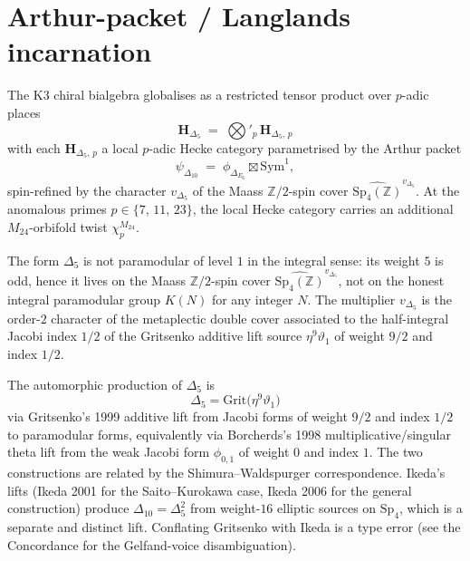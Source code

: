 \section{Arthur-packet / Langlands incarnation}
\label{sec:k3-arthur-packet}

\begin{theorem}
\label{thm:arthur-packet-H-delta5}
The K3 chiral bialgebra globalises as a restricted tensor product over $p$-adic
places
\[
 \mathbf{H}_{\Delta_5}
 \;=\;
 \bigotimes'_{p}\, \mathbf{H}_{\Delta_5,\,p}
\]
with each $\mathbf{H}_{\Delta_5,\,p}$ a local $p$-adic Hecke category parametrised by
the Arthur packet
\[
 \psi_{\Delta_{10}}
 \;=\;
 \phi_{\Delta_{E_6}} \boxtimes \mathrm{Sym}^1,
\]
spin-refined by the character $v_{\Delta_5}$ of the Maass $\mathbb{Z}/2$-spin cover
$\widehat{\mathrm{Sp}_4(\mathbb{Z})}^{v_{\Delta_5}}$. At the anomalous primes
$p \in \{7,\, 11,\, 23\}$, the local Hecke category carries an additional
$M_{24}$-orbifold twist $\chi^{M_{24}}_p$.
\end{theorem}

\begin{theorem}
\label{thm:Maass-spin-cover}
The form $\Delta_5$ is not paramodular of level $1$ in the integral sense: its
weight $5$ is odd, hence it lives on the Maass $\mathbb{Z}/2$-spin cover
$\widehat{\mathrm{Sp}_4(\mathbb{Z})}^{v_{\Delta_5}}$, not on the honest integral
paramodular group $K(N)$ for any integer $N$. The multiplier $v_{\Delta_5}$ is the
order-$2$ character of the metaplectic double cover associated to the half-integral
Jacobi index $1/2$ of the Gritsenko additive lift source $\eta^9\vartheta_1$ of
weight $9/2$ and index $1/2$.
\end{theorem}

\begin{remark}
\label{rem:gritsenko-not-ikeda}
The automorphic production of $\Delta_5$ is
\[
 \Delta_5 = \mathrm{Grit}\bigl(\eta^9\vartheta_1\bigr)
\]
via Gritsenko's 1999 additive lift from Jacobi forms of weight $9/2$ and index $1/2$
to paramodular forms, equivalently via Borcherds's 1998 multiplicative/singular theta
lift from the weak Jacobi form $\phi_{0,1}$ of weight $0$ and index $1$. The two
constructions are related by the Shimura--Waldspurger correspondence. Ikeda's lifts
(Ikeda 2001 for the Saito--Kurokawa case, Ikeda 2006 for the general construction)
produce $\Delta_{10} = \Delta_5^2$ from weight-$16$ elliptic sources on
$\mathrm{Sp}_4$, which is a separate and distinct lift. Conflating Gritsenko with
Ikeda is a type error (see the Concordance for the Gelfand-voice disambiguation).
\end{remark}

